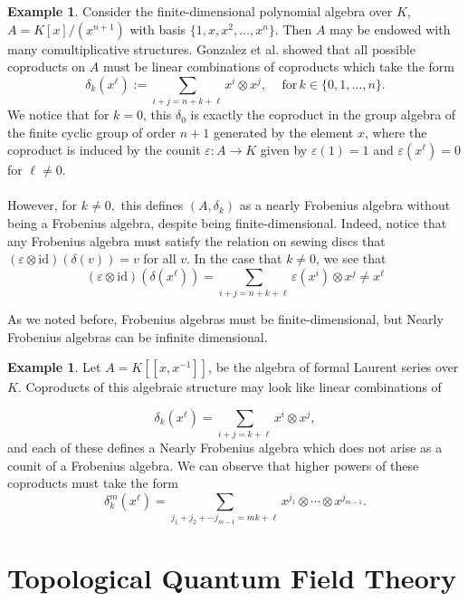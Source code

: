 \documentclass{amsart}
\newcommand{\be}{\begin{equation}}
\newcommand{\ee}{\end{equation}}
\newcommand{\tensor}{\otimes}
\newcommand{\inv}{^{-1}}
\newcommand{\eps}{\varepsilon}
\newcommand{\id}{\mathrm{id}}
\theoremstyle{definition}
\newtheorem{Ex}[Lem]{Example}
\begin{document}
\begin{Ex}\label{ex:finiteNFA}
    Consider the finite-dimensional polynomial algebra over $K$, $A=K[x]/(x^{n+1})$ with basis $\{1,x,x^2,\ldots,x^n\}$. Then $A$ may be endowed with many comultiplicative structures. Gonzalez et al. \cite{GLSU} showed that all possible coproducts on $A$ must be linear combinations of coproducts which take the form
    \be
    \delta_k(x^\ell):=\sum_{i+j=n+k+\ell}x^i \tensor x^j,\quad\mathrm{\,for\,} k\in\{0,1,\ldots,n\}.
    \ee
    We notice that for $k=0$, this $\delta_0$ is exactly the coproduct in the group algebra of the finite cyclic group of order $n+1$ generated by the element $x$, where the coproduct is induced by the counit $\eps:A\to K$ given by $\eps(1)=1$ and $\eps(x^\ell)=0$ for $\ell\neq 0$.\\
    \\
    \noindent However, for $k\neq0,$ this defines $(A,\delta_k)$ as a nearly Frobenius algebra without being a Frobenius algebra, despite being finite-dimensional. Indeed, notice that any Frobenius algebra must satisfy the relation on sewing discs that $(\eps\tensor\id)(\delta(v))=v$ for all $v$. In the case that $k\neq 0$, we see that \be
    (\eps\tensor\id)(\delta(x^\ell))=\sum_{i+j=n+k+\ell}\eps(x^i) \tensor x^j\neq x^\ell
    \ee
\end{Ex}
\noindent As we noted before, Frobenius algebras must be finite-dimensional, but Nearly Frobenius algebras can be infinite dimensional.
\begin{Ex}
    Let $A=K[[x,x\inv]]$, be the algebra of formal Laurent series over $K$. Coproducts of this algebraic structure may look like linear combinations of
    
    \be
    \delta_k(x^\ell)=\sum_{i+j=k+\ell}x^i\tensor x^j,
    \ee
    \noindent and each of these defines a Nearly Frobenius algebra which does not arise as a counit of a Frobenius algebra. We can observe that higher powers of these coproducts must take the form 
    \be
    \delta_k^{m}(x^\ell)=\sum_{j_1+j_2+\cdots j_{m-1}=mk+\ell}x^{j_1}\tensor \cdots \tensor x^{j_{m-1}}.
    \ee
\end{Ex}



\section{Topological Quantum Field Theory}\label{sec:TQFT}
\end{document}
